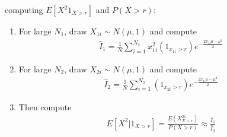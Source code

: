 \documentclass[12pt]{article}
\theoremstyle{plain}
\theoremstyle{definition}
\theoremstyle{remark}
\begin{document}
\begin{enumerate}
\begin{enumerate}
        computing $E[X^2 1_{X>r}]$ and $P(X>r)$:
        \begin{enumerate}
          \item For large $N_1$, draw $X_{1i} \sim N(\mu,1)$ and compute
            \begin{align*}
              \hat{I}_1 = \frac{1}{N} \sum^{N_2}_{i=1}
              x_{1i}^2 (1_{x_{1i} > r}) e^{-\frac{2x_{1i}\mu-\mu^2}{2}}
            \end{align*}
          \item For large $N_2$, draw $X_{2i} \sim N(\mu,1)$ and compute
            \begin{align*}
              \hat{I}_2 = \frac{1}{N} \sum^{N_2}_{i=1}
              (1_{x_{2i} > r}) e^{-\frac{2x_{2i}\mu-\mu^2}{2}}
            \end{align*}
          \item Then compute
            \begin{align}
              E[X^2|1_{X>r}] = \frac{E(X^21_{X>r})}{P(X>r)}
              \approx \frac{\hat{I}_1}{\hat{I}_2}
              \label{q4b.2}
            \end{align}
        \end{enumerate}



\end{enumerate}
\end{enumerate}
\end{document}
